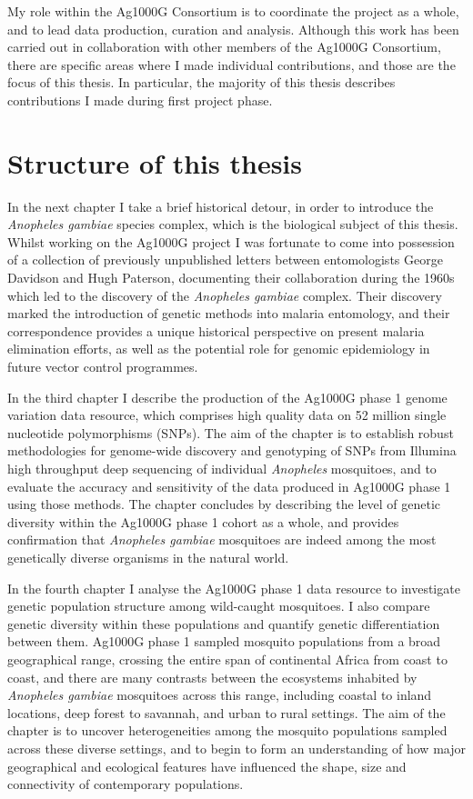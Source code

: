 \begin{refsection}
My role within the Ag1000G Consortium is to coordinate the project as a whole, and to lead data production, curation and analysis.
%
Although this work has been carried out in collaboration with other members of the Ag1000G Consortium, there are specific areas where I made individual contributions, and those are the focus of this thesis.
%
In particular, the majority of this thesis describes contributions I made during first project phase.


\section{Structure of this thesis}\label{sec:structure}


In the next chapter I take a brief historical detour, in order to introduce the \textit{Anopheles gambiae} species complex, which is the biological subject of this thesis.
%
Whilst working on the Ag1000G project I was fortunate to come into possession of a collection of previously unpublished letters between entomologists George Davidson and Hugh Paterson, documenting their collaboration during the 1960s which led to the discovery of the \textit{Anopheles gambiae} complex.
%
Their discovery marked the introduction of genetic methods into malaria entomology, and their correspondence provides a unique historical perspective on present malaria elimination efforts, as well as the potential role for genomic epidemiology in future vector control programmes.

In the third chapter I describe the production of the Ag1000G phase 1 genome variation data resource, which comprises high quality data on 52 million single nucleotide polymorphisms (SNPs).
%
The aim of the chapter is to establish robust methodologies for genome-wide discovery and genotyping of SNPs from Illumina high throughput deep sequencing of individual \textit{Anopheles} mosquitoes, and to evaluate the accuracy and sensitivity of the data produced in Ag1000G phase 1 using those methods.
%
The chapter concludes by describing the level of genetic diversity within the Ag1000G phase 1 cohort as a whole, and provides confirmation that \textit{Anopheles gambiae} mosquitoes are indeed among the most genetically diverse organisms in the natural world.


In the fourth chapter I analyse the Ag1000G phase 1 data resource to investigate genetic population structure among wild-caught mosquitoes.
%
I also compare genetic diversity within these populations and quantify genetic differentiation between them.
%
Ag1000G phase 1 sampled mosquito populations from a broad geographical range, crossing the entire span of continental Africa from coast to coast, and there are many contrasts between the ecosystems inhabited by \textit{Anopheles gambiae} mosquitoes across this range, including coastal to inland locations, deep forest to savannah, and urban to rural settings.
%
The aim of the chapter is to uncover heterogeneities among the mosquito populations sampled across these diverse settings, and to begin to form an understanding of how major geographical and ecological features have influenced the shape, size and connectivity of contemporary populations.



\end{refsection}
